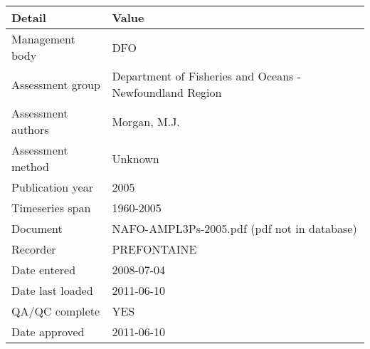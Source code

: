 \begin{table}[htb]
\centering
\begin{tabular}{lp{7cm}}
\toprule
Detail & Value \\
\midrule
Management body    & DFO                                                      \\
Assessment group   & Department of Fisheries and Oceans - Newfoundland Region \\
Assessment authors & Morgan, M.J.                                             \\
Assessment method  & Unknown                                                  \\
Publication year   & 2005                                                     \\
Timeseries span    & 1960-2005                                                \\
Document           & NAFO-AMPL3Ps-2005.pdf (pdf not in database)              \\
Recorder           & PREFONTAINE                                              \\
Date entered       & 2008-07-04                                               \\
Date last loaded   & 2011-06-10                                               \\
QA/QC complete     & YES                                                      \\
Date approved      & 2011-06-10                                               \\
\bottomrule
\end{tabular}
\label{tab:assessdet}
\end{table}
